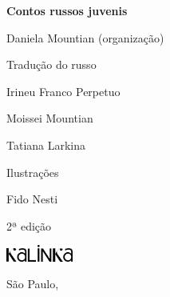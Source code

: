 




\begingroup\thispagestyle{empty}\parindent0pt%

              \Huge 
              \textbf{Contos russos juvenis}
              \vspace{2em}

  					  \large
              {\textmdbf Daniela Mountian (organização)}
              \vspace{2em}

              \normalsize  
              {\textmdbf Tradução do russo}

              Irineu Franco Perpetuo

              Moissei Mountian

              Tatiana Larkina

              \bigskip

              {\textmdbf Ilustrações}

              Fido Nesti

              \vfill

              \begin{center}
              2ª edição

              \smallskip

              \includegraphics[width=2.2cm]{./logo.jpg}

              São Paulo, \the\year
              \end{center}
\endgroup
\pagebreak

